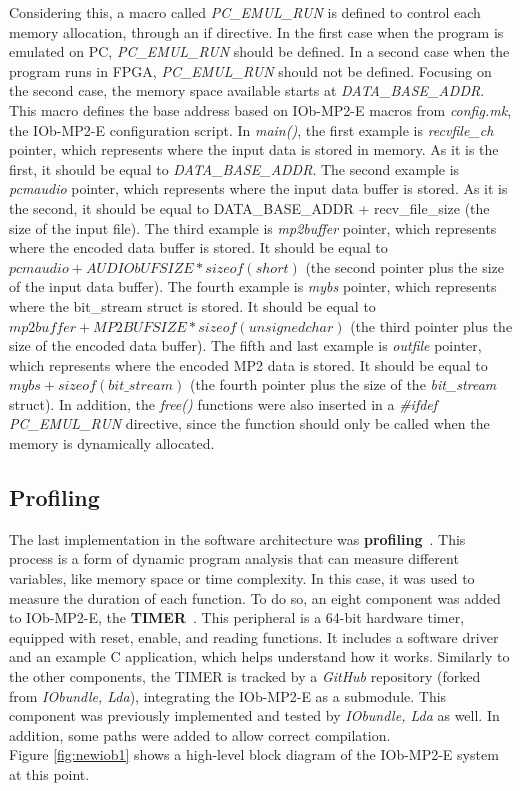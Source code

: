 Considering this, a macro called \textit{PC\_EMUL\_RUN} is defined to control each memory allocation, through an if directive. In the first case when the program is emulated on PC, \textit{PC\_EMUL\_RUN} should be defined. In a second case when the program runs in FPGA, \textit{PC\_EMUL\_RUN} should not be defined.
Focusing on the second case, the memory space available starts at \textit{DATA\_BASE\_ADDR}. This macro defines the base address based on IOb-MP2-E macros from \textit{config.mk}, the IOb-MP2-E configuration script.
In \textit{main()}, the first example is \textit{recvfile\_ch} pointer, which represents where the input data is stored in memory. As it is the first, it should be equal to \textit{DATA\_BASE\_ADDR}.
The second example is \textit{pcmaudio} pointer, which represents where the input data buffer is stored. As it is the second, it should be equal to DATA\_BASE\_ADDR + recv\_file\_size (the size of the input file).
The third example is \textit{mp2buffer} pointer, which represents where the encoded data buffer is stored. It should be equal to $pcmaudio + AUDIObUFSIZE*sizeof(short)$ (the second pointer plus the size of the input data buffer).
The fourth example is \textit{mybs} pointer, which represents where the bit\_stream struct is stored. It should be equal to $mp2buffer + MP2BUFSIZE*sizeof(unsigned char)$ (the third pointer plus the size of the encoded data buffer).
The fifth and last example is \textit{outfile} pointer, which represents where the encoded MP2 data is stored. It should be equal to $mybs + sizeof(bit\_stream)$ (the fourth pointer plus the size of the \textit{bit\_stream} struct).
In addition, the \textit{free()} functions were also inserted in a \textit{\#ifdef PC\_EMUL\_RUN} directive, since the function should only be called when the memory is dynamically allocated. \\

\subsection{Profiling}

The last implementation in the software architecture was \textbf{profiling}~\cite{profiling}. This process is a form of dynamic program analysis that can measure different variables, like memory space or time complexity. In this case, it was used to measure the duration of each function.
To do so, an eight component was added to IOb-MP2-E, the \textbf{TIMER}~\cite{bib:iobtimer}. This peripheral is a 64-bit hardware timer, equipped with reset, enable, and reading functions. It includes a software driver and an example C application, which helps understand how it works. 
Similarly to the other components, the TIMER is tracked by a \textit{GitHub} repository (forked from \textit{IObundle, Lda}), integrating the IOb-MP2-E as a submodule. This component was previously implemented and tested by \textit{IObundle, Lda} as well. In addition, some paths were added to allow correct compilation.\\
Figure \ref{fig:newiob1} shows a high-level block diagram of the IOb-MP2-E system at this point.

